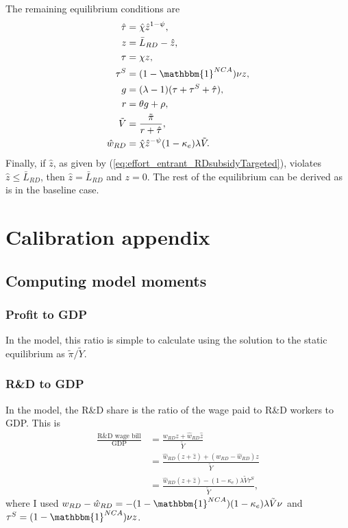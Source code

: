 \documentclass[11pt,english]{article}
\theoremstyle{definition}
\begin{document}
The remaining equilibrium conditions are
\begin{align}
\hat{\tau} &= \hat{\chi} \hat{z}^{1-\psi}, \\
z &= \bar{L}_{RD} - \hat{z}, \label{eq:labor_resource_constraint_RDsubsidyTargeted}\\ 
\tau &= \chi z ,\\
\tau^S &= (1-\mathbbm{1}^{NCA}) \nu z ,\\
g &= (\lambda - 1) (\tau + \tau^S + \hat{\tau}), \\
r &= \theta g + \rho ,\\
\tilde{V} &= \frac{\tilde{\pi}}{r + \hat{\tau}}, \\ 
\hat{w}_{RD} &= \hat{\chi} \hat{z}^{-\psi} (1-\kappa_e) \lambda \tilde{V}. \label{eq:wage_rd_labor_RDsubsidyTargeted}
\end{align}
Finally, if $\hat{z}$, as given by (\ref{eq:effort_entrant_RDsubsidyTargeted}), violates $\hat{z} \le \bar{L}_{RD}$, then $\hat{z} = \bar{L}_{RD}$ and $z = 0$. The rest of the equilibrium can be derived as is in the baseline case.


\section{Calibration appendix}\label{appendix:calibration}

\subsection{Computing model moments}

\subsubsection{Profit to GDP}\label{appendix:calibration:profits/gdp}

In the model, this ratio is simple to calculate using the solution to the static equilibrium as $\tilde{\pi} / \tilde{Y}$.

\subsubsection{R\&D to GDP}\label{appendix:calibration:rd/gdp}

In the model, the R\&D share is the ratio of the wage paid to R\&D workers to GDP. This is
\begin{align*}
\frac{\textrm{R\&D wage bill}}{\textrm{GDP}} &= \frac{w_{RD} z + \hat{w}_{RD} \hat{z}}{\tilde{Y}} \\ 
&= \frac{\hat{w}_{RD} (z + \hat{z}) + (w_{RD} - \hat{w}_{RD})z}{\tilde{Y}} \\
&= \frac{\hat{w}_{RD} (z + \hat{z}) - (1-\kappa_e) \lambda \tilde{V} \tau^S}{\tilde{Y}},
\end{align*}
where I used $w_{RD} - \hat{w}_{RD} = -(1-\mathbbm{1}^{NCA})(1-\kappa_e) \lambda \tilde{V} \nu$ and $\tau^S = (1-\mathbbm{1}^{NCA})\nu z$. 
\end{document}
